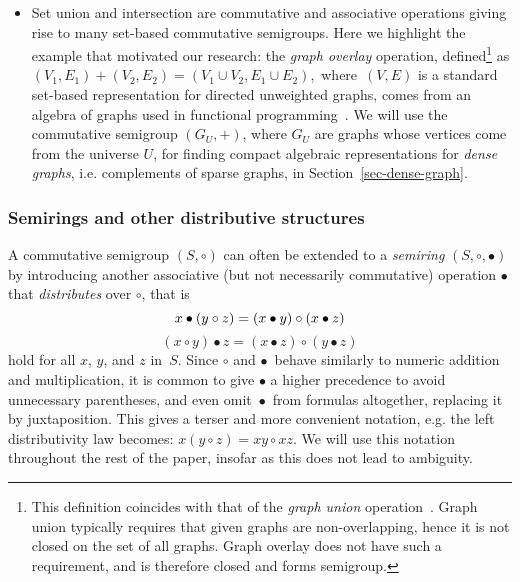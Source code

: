 \begin{itemize}
  \item Set union and intersection are commutative and associative operations
  giving rise to many set-based commutative semigroups. Here we highlight the
  example 
  {}  
  that motivated our research: the \emph{graph overlay} operation,
  defined\footnote{This definition coincides with that of the
  \emph{graph union} operation~\cite{1969_graph_theory_harary}. Graph union
  typically requires that given graphs are non-overlapping, hence it is not
  closed on the set of all graphs. Graph overlay does not have such a
  requirement, and is therefore closed and forms semigroup.} as
  $(V_1, E_1) + (V_2, E_2) = (V_1 \cup V_2, E_1 \cup E_2)$,~where~$(V, E)$ is
  a standard set-based representation for directed unweighted graphs, comes from
  an algebra of graphs used in functional programming~\cite{mokhov2017algebraic}.
  We will use the commutative semigroup $(G_U,+)$, where $G_U$ are graphs whose
  vertices come from the universe $U$, for finding compact algebraic
  representations for \emph{dense graphs}, i.e. complements of sparse graphs,
  in Section~\ref{sec-dense-graph}.
\end{itemize}

\subsubsection{Semirings and other distributive structures}

A commutative semigroup $(S, \circ)$ can often be extended to a \emph{semiring}
$(S, \circ, \bullet)$ by introducing another associative (but not necessarily
commutative) operation $\bullet$ that \emph{distributes} over $\circ$, that is
\[
x \bullet (y \circ z) = (x \bullet y) \circ (x \bullet z)\\
\]
\[
(x \circ y) \bullet z = (x \bullet z) \circ (y \bullet z)
\]
hold for all $x$, $y$, and $z$ in~$S$. Since $\circ$ and $\bullet$~behave
similarly to numeric addition and multiplication, it is common to give $\bullet$
a higher precedence to avoid unnecessary parentheses, and even omit~$\bullet$~from
formulas altogether, replacing it by juxtaposition. This gives a terser and
more convenient notation, e.g. the left distributivity law becomes:
$x (y \circ z) = x y \circ x z$. We will use this notation throughout the rest
of the paper, insofar as this does not lead to ambiguity.


